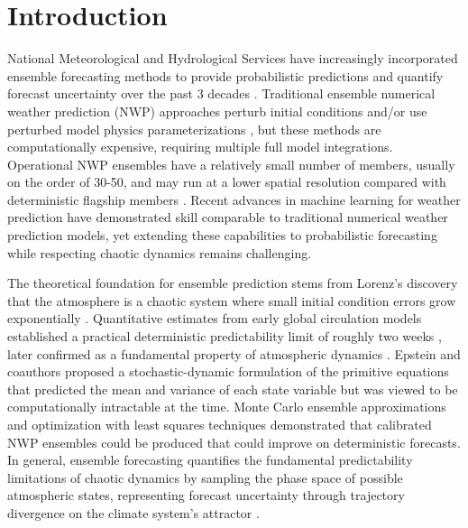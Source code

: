 \documentclass[11pt]{article}
\begin{document}
\section{Introduction}
National Meteorological and Hydrological Services have increasingly incorporated ensemble forecasting methods to provide probabilistic predictions and quantify forecast uncertainty over the past 3 decades \cite{leutbecher2008svs, palmer2019stochastic}. Traditional ensemble numerical weather prediction (NWP) approaches perturb initial conditions and/or use perturbed model physics parameterizations \cite{molteni1996ens,buizza2005comparison,leutbecher2017stochastic, berner2017stochastic}, but these methods are computationally expensive, requiring multiple full model integrations. Operational NWP ensembles have a relatively small number of members, usually on the order of 30-50, and may run at a lower spatial resolution compared with deterministic flagship members \cite{Fu2024-zo}. Recent advances in machine learning for weather prediction \cite{keisler2022fourcastnet, pathak2022fourcastnet, bi2023pangu, Lam2023graphcast, chen2023fuxi, schreck2025} have demonstrated skill comparable to traditional numerical weather prediction models, yet extending these capabilities to probabilistic forecasting while respecting chaotic dynamics remains challenging. 

The theoretical foundation for ensemble prediction stems from Lorenz's discovery that the atmosphere is a chaotic system where small initial condition errors grow exponentially \cite{lorenz1963deterministic}. Quantitative estimates from early global circulation models established a practical deterministic predictability limit of roughly two weeks \cite{charney1966applicability}, later confirmed as a fundamental property of atmospheric dynamics \cite{lorenz1969predictability, Lorenz1969-tc, lorenz1996predictability}. Epstein and coauthors \cite{Epstein1969-nj} proposed a stochastic-dynamic formulation of the primitive equations that predicted the mean and variance of each state variable but was viewed to be computationally intractable at the time. Monte Carlo ensemble approximations \cite{Leith1974} and optimization with least squares techniques \cite{Pitcher1977-li} demonstrated that calibrated NWP ensembles could be produced that could improve on deterministic forecasts. In general, ensemble forecasting quantifies the fundamental predictability limitations of chaotic dynamics by sampling the phase space of possible atmospheric states, representing forecast uncertainty through trajectory divergence on the climate system's attractor \cite{palmer2019stochastic, toth1993ensemble}.
\end{document}
